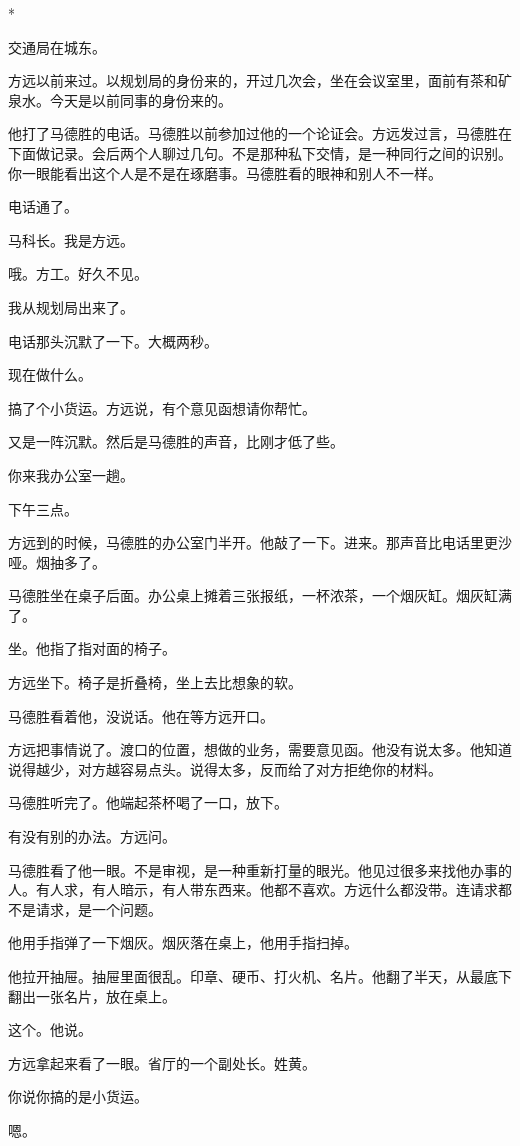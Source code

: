 \documentclass[UTF8,a5paper,11pt,openany]{ctexbook}
\newcommand{\scene}{\vspace{1em}\begin{center}*\quad*\quad*\end{center}\vspace{0.5em}}
\begin{document}
\scene

交通局在城东。

方远以前来过。以规划局的身份来的，开过几次会，坐在会议室里，面前有茶和矿泉水。今天是以前同事的身份来的。

他打了马德胜的电话。马德胜以前参加过他的一个论证会。方远发过言，马德胜在下面做记录。会后两个人聊过几句。不是那种私下交情，是一种同行之间的识别。你一眼能看出这个人是不是在琢磨事。马德胜看的眼神和别人不一样。

电话通了。

马科长。我是方远。

哦。方工。好久不见。

我从规划局出来了。

电话那头沉默了一下。大概两秒。

现在做什么。

搞了个小货运。方远说，有个意见函想请你帮忙。

又是一阵沉默。然后是马德胜的声音，比刚才低了些。

你来我办公室一趟。

下午三点。

方远到的时候，马德胜的办公室门半开。他敲了一下。进来。那声音比电话里更沙哑。烟抽多了。

马德胜坐在桌子后面。办公桌上摊着三张报纸，一杯浓茶，一个烟灰缸。烟灰缸满了。

坐。他指了指对面的椅子。

方远坐下。椅子是折叠椅，坐上去比想象的软。

马德胜看着他，没说话。他在等方远开口。

方远把事情说了。渡口的位置，想做的业务，需要意见函。他没有说太多。他知道说得越少，对方越容易点头。说得太多，反而给了对方拒绝你的材料。

马德胜听完了。他端起茶杯喝了一口，放下。

有没有别的办法。方远问。

马德胜看了他一眼。不是审视，是一种重新打量的眼光。他见过很多来找他办事的人。有人求，有人暗示，有人带东西来。他都不喜欢。方远什么都没带。连请求都不是请求，是一个问题。

他用手指弹了一下烟灰。烟灰落在桌上，他用手指扫掉。

他拉开抽屉。抽屉里面很乱。印章、硬币、打火机、名片。他翻了半天，从最底下翻出一张名片，放在桌上。

这个。他说。

方远拿起来看了一眼。省厅的一个副处长。姓黄。

你说你搞的是小货运。

嗯。
\end{document}
